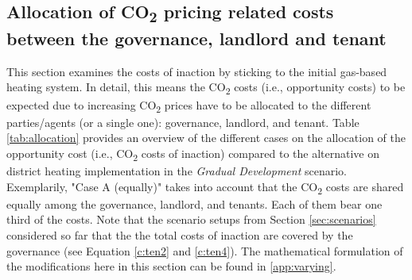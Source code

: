 \subsection{Allocation of CO\textsubscript{2} pricing related costs between the governance, landlord and tenant}\label{res:co2_shares}
This section examines the costs of inaction by sticking to the initial gas-based heating system. In detail, this means the CO\textsubscript{2} costs (i.e., opportunity costs) to be expected due to increasing CO\textsubscript{2} prices have to be allocated to the different parties/agents (or a single one): governance, landlord, and tenant. Table \ref{tab:allocation} provides an overview of the different cases on the allocation of the opportunity cost (i.e., CO\textsubscript{2} costs of inaction) compared to the alternative on district heating implementation in the \textit{Gradual Development} scenario. Exemplarily, "Case A (equally)" takes into account that the CO\textsubscript{2} costs are shared equally among the governance, landlord, and tenants. Each of them bear one third of the costs. Note that the scenario setups from Section \ref{sec:scenarios} considered so far that the the total costs of inaction are covered by the governance (see Equation \ref{c:ten2} and \ref{c:ten4}). The mathematical formulation of the modifications here in this section can be found in \ref{app:varying}.

\begin{table}[h]
	\centering
	\caption{Allocation of the CO\textsubscript{2}-related opportunity costs (costs of inaction) among the governance, the landlord, and tenants}
	\label{tab:allocation}
\end{table}

